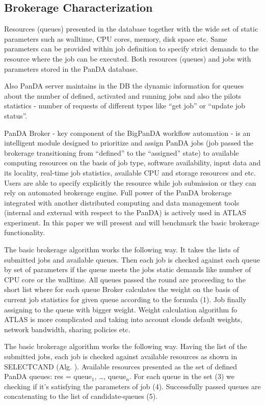 \subsection{Brokerage Characterization}
\label{subsec:brokerage}

Resources (queues) presented in the database together with the wide set of
static parameters such as walltime, CPU cores, memory, disk space etc. Same
parameters can be provided within job definition to specify strict demands to
the resource where the job can be executed. Both resources (queues) and jobs
with parameters stored in the PanDA database.

Also PanDA server maintains in the DB the dynamic information for queues
about the number of defined, activated and running jobs and also the pilots
statistics - number of requests of different types like ``get job'' or
``update job status''.

PanDA Broker - key  component of the BigPanDA workflow automation - is an
intelligent module designed to prioritize and assign PanDA jobs (job passed
the brokerage transitioning from ``defined'' to the ``assigned'' state) to
available computing resources on the basis of job type, software
availability, input data and its locality, real-time job statistics,
available CPU and storage resources and etc. Users are able to specify
explicitly the resource while job submission or they can rely on automated
brokerage engine. Full power of the PanDA brokerage integrated with another
distributed computing and data management tools (internal and external with
respect to the PanDA) is actively used in ATLAS experiment. In this paper we
will present and will benchmark the basic brokerage functionality.

The basic brokerage algorithm works the following way. It takes the lists of
submitted jobs and available queues. Then each job is checked against each
queue by set of parameters if the queue meets the jobs static demands like
number of CPU core or the walltime. All queues passed the round are
proceeding to the short list where for each queue Broker calculates the
weight on the basis of current job statistics for given queue according to
the formula (1). Job finally assigning to the queue with bigger weight.
Weight calculation algorithm fo ATLAS is more complicated and taking into
account clouds default weights, network bandwidth, sharing policies etc.

The basic brokerage algorithm works the following way. Having the list of the
submitted jobs, each job is checked against available resources as shown in
SELECT{\textunderscore}CAND (Alg. ). Available resources presented as the set
of defined PanDA queues: res = queue$_1$, \ldots, queue$_n$. For each queue
in the set (3) we checking if it's satisfying the parameters of job (4).
Successfully passed queues are concatenating to the list of candidate-queues
(5).

